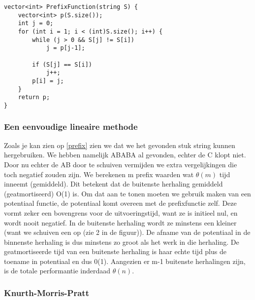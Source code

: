 \begin{lstlisting}
vector<int> PrefixFunction(string S) {
    vector<int> p(S.size());
    int j = 0;
    for (int i = 1; i < (int)S.size(); i++) {
        while (j > 0 && S[j] != S[i])
            j = p[j-1];

        if (S[j] == S[i])
            j++;
        p[i] = j;
    }   
    return p;
}
\end{lstlisting}
\clearpage
\subsubsection{Een eenvoudige lineaire methode}
Zoals je kan zien op \ref{prefix} zien we dat we het gevonden stuk string kunnen hergebruiken. We hebben namelijk ABABA al gevonden, echter de C klopt niet. Door nu echter de AB door te schuiven vermijden we extra vergelijkingen die toch negatief zouden zijn.
\npar
We berekenen m prefix waarden wat $\theta(m)$ tijd inneemt (gemiddeld). Dit betekent dat de buitenste herhaling gemiddeld (geatmortiseerd) O(1) is. Om dat aan te tonen moeten we gebruik maken van een potentiaal functie, de potentiaal komt overeen met de prefixfunctie zelf. 
Deze vormt zeker een bovengrens voor de uitvoeringstijd, want ze is initieel nul, en wordt nooit negatief. In de buitenste herhaling wordt ze minstens een kleiner (want we schuiven een op (zie 2 in de figuur)).
\npar
De afname van de potentiaal in de binnenste herhaling is dus minstens zo groot als het werk in die herhaling. De geatmortiseerde tijd van een buitenste herhaling is haar echte tijd plus de toename in potentiaal en dus 0(1). Aangezien er m-1 buitenste herhalingen zijn, is de totale performantie inderdaad $\theta(n)$.
\clearpage
\subsubsection{Knurth-Morris-Pratt}
